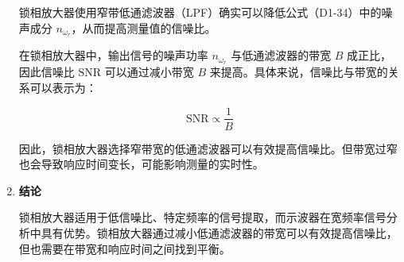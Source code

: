 \documentclass[dvipsnames, svgnames,a4paper,11pt]{article}
\begin{document}
\begin{enumerate}
		锁相放大器使用窄带低通滤波器（LPF）确实可以降低公式（D1-34）中的噪声成分 $n_{\omega_r}$，从而提高测量值的信噪比。

		在锁相放大器中，输出信号的噪声功率 $n_{\omega_r}$ 与低通滤波器的带宽 $B$ 成正比，因此信噪比 $\text{SNR}$ 可以通过减小带宽 $B$ 来提高。具体来说，信噪比与带宽的关系可以表示为：

		\[
		\text{SNR} \propto \frac{1}{B}
		\]

		因此，锁相放大器选择窄带宽的低通滤波器可以有效提高信噪比。但带宽过窄也会导致响应时间变长，可能影响测量的实时性。

		\item \textbf{结论}

		锁相放大器适用于低信噪比、特定频率的信号提取，而示波器在宽频率信号分析中具有优势。锁相放大器通过减小低通滤波器的带宽可以有效提高信噪比，但也需要在带宽和响应时间之间找到平衡。

	\end{enumerate}
\end{document}
